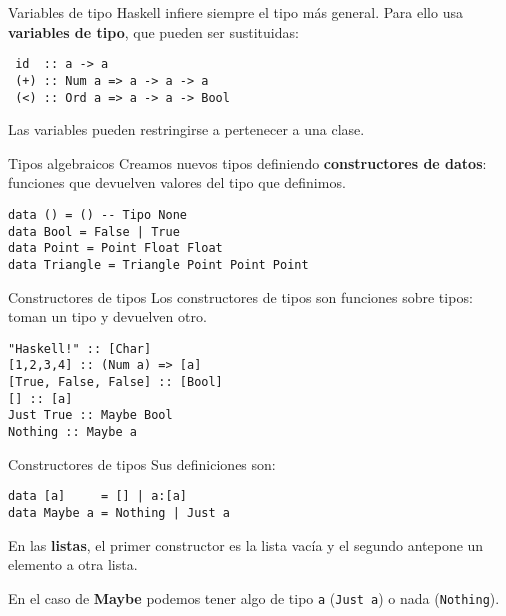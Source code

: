 \begin{frame}[fragile]{Variables de tipo}
  Haskell infiere siempre el tipo más general.
  Para ello usa \textbf{variables de tipo}, que pueden ser sustituidas:

  \espacio

  \begin{lstlisting}
 id  :: a -> a
 (+) :: Num a => a -> a -> a
 (<) :: Ord a => a -> a -> Bool
  \end{lstlisting}

  \espacio

  Las variables pueden restringirse a pertenecer a una clase.

\end{frame}

\begin{frame}[fragile]{Tipos algebraicos}
  Creamos nuevos tipos definiendo \textbf{constructores de datos}: funciones que
  devuelven valores del tipo que definimos.

  \espacio

  \begin{lstlisting}
data () = () -- Tipo None
data Bool = False | True
data Point = Point Float Float
data Triangle = Triangle Point Point Point
  \end{lstlisting}

\end{frame}

\begin{frame}[fragile]{Constructores de tipos}
  Los constructores de tipos son funciones sobre tipos: toman un tipo y devuelven otro.

  \espacio

  \begin{lstlisting}
"Haskell!" :: [Char]
[1,2,3,4] :: (Num a) => [a]
[True, False, False] :: [Bool]
[] :: [a]
Just True :: Maybe Bool
Nothing :: Maybe a
  \end{lstlisting}

\end{frame}

\begin{frame}[fragile]{Constructores de tipos}
  Sus definiciones son:

  \espacio

  \begin{lstlisting}
data [a]     = [] | a:[a]
data Maybe a = Nothing | Just a
  \end{lstlisting}

  \espacio

  En las \textbf{listas}, el primer constructor es la lista vacía y
  el segundo antepone un elemento a otra lista.

  \espacio

  En el caso de \textbf{Maybe} podemos tener algo de tipo \texttt{a} (\texttt{Just a})
  o nada (\texttt{Nothing}).
\end{frame}
